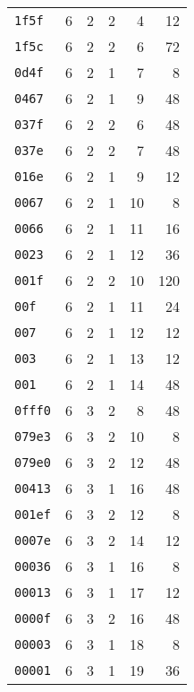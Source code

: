 \begin{center}
\begin{longtable}{lrrrrr}
\texttt{1f5f} & 6 & 2 & 2 & 4 & 12 \\ 
\texttt{1f5c} & 6 & 2 & 2 & 6 & 72 \\ 
\texttt{0d4f} & 6 & 2 & 1 & 7 & 8 \\ 
\texttt{0467} & 6 & 2 & 1 & 9 & 48 \\ 
\texttt{037f} & 6 & 2 & 2 & 6 & 48 \\ 
\texttt{037e} & 6 & 2 & 2 & 7 & 48 \\ 
\texttt{016e} & 6 & 2 & 1 & 9 & 12 \\ 
\texttt{0067} & 6 & 2 & 1 & 10 & 8 \\ 
\texttt{0066} & 6 & 2 & 1 & 11 & 16 \\ 
\texttt{0023} & 6 & 2 & 1 & 12 & 36 \\ 
\texttt{001f} & 6 & 2 & 2 & 10 & 120 \\ 
\texttt{00f} & 6 & 2 & 1 & 11 & 24 \\ 
\texttt{007} & 6 & 2 & 1 & 12 & 12 \\ 
\texttt{003} & 6 & 2 & 1 & 13 & 12 \\ 
\texttt{001} & 6 & 2 & 1 & 14 & 48 \\ 
\texttt{0fff0} & 6 & 3 & 2 & 8 & 48 \\ 
\texttt{079e3} & 6 & 3 & 2 & 10 & 8 \\ 
\texttt{079e0} & 6 & 3 & 2 & 12 & 48 \\ 
\texttt{00413} & 6 & 3 & 1 & 16 & 48 \\ 
\texttt{001ef} & 6 & 3 & 2 & 12 & 8 \\ 
\texttt{0007e} & 6 & 3 & 2 & 14 & 12 \\ 
\texttt{00036} & 6 & 3 & 1 & 16 & 8 \\ 
\texttt{00013} & 6 & 3 & 1 & 17 & 12 \\ 
\texttt{0000f} & 6 & 3 & 2 & 16 & 48 \\ 
\texttt{00003} & 6 & 3 & 1 & 18 & 8 \\ 
\texttt{00001} & 6 & 3 & 1 & 19 & 36 \\ 
\bottomrule
\end{longtable}
\end{center}


